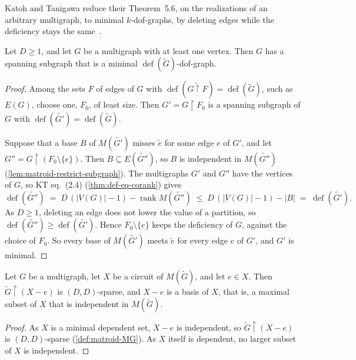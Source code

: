 Katoh and Tanigawa reduce their Theorem~5.6, on the realizations of an
arbitrary multigraph, to minimal $k$-dof-graphs, by deleting edges
while the deficiency stays the same~\cite[p.~670]{katohTanigawa2011}.

\begin{lemma}
  \label{lem:minimal-kdof-spanning-subgraph}
  \leanok
  Let $D \ge 1$, and let $G$ be a multigraph with at least one vertex.
  Then $G$ has a spanning subgraph that is a minimal
  $\operatorname{def}(\tilde G)$-dof-graph.
\end{lemma}
\begin{proof}
  \leanok
  Among the sets $F$ of edges of $G$ with
  $\operatorname{def}(\widetilde{G \restriction F}) =
  \operatorname{def}(\tilde G)$, such as $E(G)$, choose one, $F_0$, of
  least size. Then $G' = G \restriction F_0$ is a spanning subgraph of
  $G$ with $\operatorname{def}(\widetilde{G'}) = \operatorname{def}(\tilde G)$.

  Suppose that a base $B$ of $M(\widetilde{G'})$ misses $\tilde e$ for
  some edge $e$ of $G'$, and let
  $G'' = G \restriction (F_0 \setminus \{e\})$. Then
  $B \subseteq E(\widetilde{G''})$, so $B$ is independent in
  $M(\widetilde{G''})$ (\cref{lem:matroid-restrict-subgraph}). The
  multigraphs $G'$ and $G''$ have the vertices of $G$, so KT
  eq.~(2.4) (\cref{thm:def-eq-corank}) gives
  \[
    \operatorname{def}(\widetilde{G''})
    \;=\; D\,(|V(G)| - 1) - \operatorname{rank} M(\widetilde{G''})
    \;\le\; D\,(|V(G)| - 1) - |B|
    \;=\; \operatorname{def}(\widetilde{G'}).
  \]
  As $D \ge 1$, deleting an edge does not lower the value of a
  partition, so $\operatorname{def}(\widetilde{G''}) \ge
  \operatorname{def}(\widetilde{G'})$. Hence $F_0 \setminus \{e\}$ keeps
  the deficiency of $G$, against the choice of $F_0$. So every base of
  $M(\widetilde{G'})$ meets $\tilde e$ for every edge $e$ of $G'$, and
  $G'$ is minimal.
\end{proof}

\begin{lemma}
  \label{lem:circuit-rigid}
  \leanok
  Let $G$ be a multigraph, let $X$ be a circuit of $M(\tilde G)$, and
  let $e \in X$. Then $\tilde G \restriction (X - e)$ is
  $(D, D)$-sparse, and $X - e$ is a basis of $X$, that is, a maximal
  subset of $X$ that is independent in $M(\tilde G)$.
\end{lemma}
\begin{proof}
  \leanok
  As $X$ is a minimal dependent set, $X - e$ is independent, so
  $\tilde G \restriction (X - e)$ is $(D, D)$-sparse
  (\cref{def:matroid-MG}). As $X$ itself is dependent, no larger subset
  of $X$ is independent.
\end{proof}

